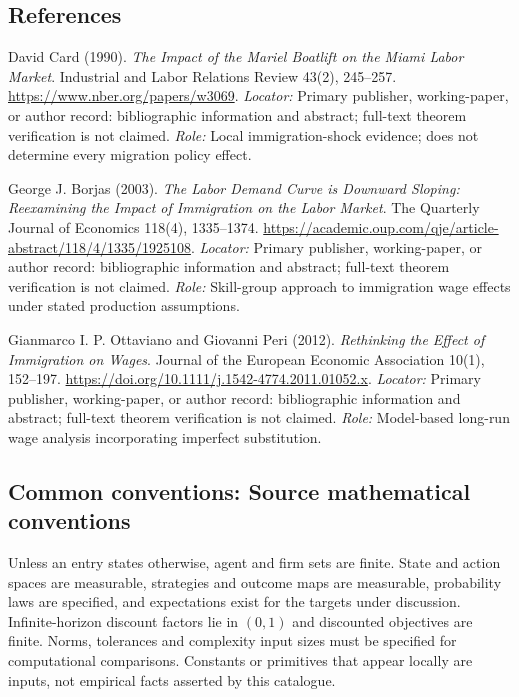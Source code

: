 \documentclass[11pt,a4paper]{article}
\begin{document}
\subsection*{References}
\begin{enumerate}[label=\textnormal{[S\arabic*]},leftmargin=*]
\item David Card (1990). \emph{The Impact of the Mariel Boatlift on the Miami Labor Market}. Industrial and Labor Relations Review 43(2), 245--257. \url{https://www.nber.org/papers/w3069}. \textit{Locator:} Primary publisher, working-paper, or author record: bibliographic information and abstract; full-text theorem verification is not claimed. \textit{Role:} Local immigration-shock evidence; does not determine every migration policy effect.
\item George J. Borjas (2003). \emph{The Labor Demand Curve is Downward Sloping: Reexamining the Impact of Immigration on the Labor Market}. The Quarterly Journal of Economics 118(4), 1335--1374. \url{https://academic.oup.com/qje/article-abstract/118/4/1335/1925108}. \textit{Locator:} Primary publisher, working-paper, or author record: bibliographic information and abstract; full-text theorem verification is not claimed. \textit{Role:} Skill-group approach to immigration wage effects under stated production assumptions.
\item Gianmarco I. P. Ottaviano and Giovanni Peri (2012). \emph{Rethinking the Effect of Immigration on Wages}. Journal of the European Economic Association 10(1), 152--197. \url{https://doi.org/10.1111/j.1542-4774.2011.01052.x}. \textit{Locator:} Primary publisher, working-paper, or author record: bibliographic information and abstract; full-text theorem verification is not claimed. \textit{Role:} Model-based long-run wage analysis incorporating imperfect substitution.
\end{enumerate}

\subsection*{Common conventions: Source mathematical conventions}

Unless an entry states otherwise, agent and firm sets are finite. State and action spaces are measurable, strategies and outcome maps are measurable, probability laws are specified, and expectations exist for the targets under discussion. Infinite-horizon discount factors lie in $(0,1)$ and discounted objectives are finite. Norms, tolerances and complexity input sizes must be specified for computational comparisons. Constants or primitives that appear locally are inputs, not empirical facts asserted by this catalogue.
\end{document}
